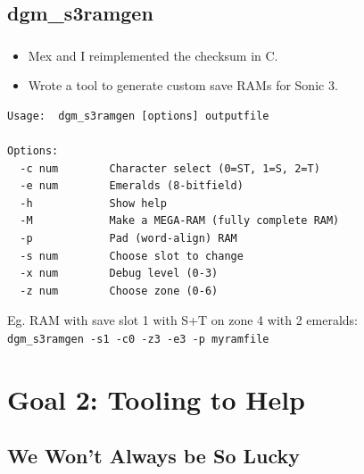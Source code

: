 \documentclass{beamer}
\begin{document}

\subsection{dgm\_s3ramgen}

\begin{frame}[fragile]
\frametitle{\insertsubsection}

\begin{itemize}
\item Mex and I reimplemented the checksum in C.
\item Wrote a tool to generate custom save RAMs for Sonic 3.
\end{itemize}

\begin{lstlisting}[basicstyle={\tt\scriptsize}]
Usage:  dgm_s3ramgen [options] outputfile

Options:
  -c num        Character select (0=ST, 1=S, 2=T)
  -e num        Emeralds (8-bitfield)
  -h            Show help
  -M            Make a MEGA-RAM (fully complete RAM)
  -p            Pad (word-align) RAM
  -s num        Choose slot to change
  -x num        Debug level (0-3)
  -z num        Choose zone (0-6)
\end{lstlisting}

\vfill

Eg. RAM with save slot 1 with S+T on zone 4 with 2 emeralds:\\{\tt dgm\_s3ramgen -s1 -c0 -z3 -e3 -p myramfile}


\end{frame}


\section{Goal 2: Tooling to Help}

\subsection{We Won't Always be So Lucky}
\end{document}
